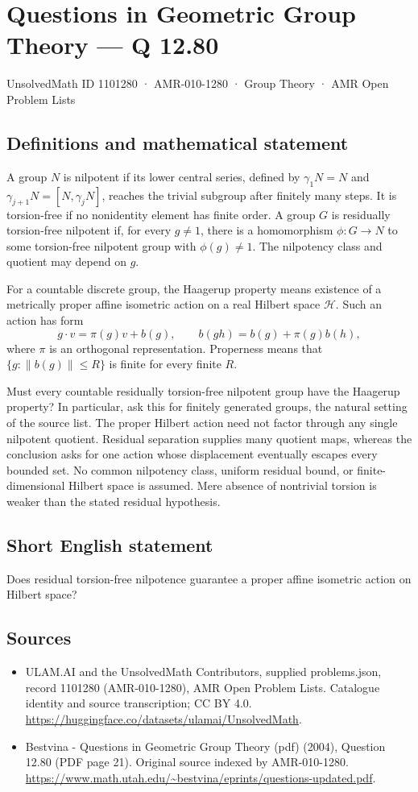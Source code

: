\documentclass[11pt,a4paper]{article}
\begin{document}
\section*{Questions in Geometric Group Theory — Q 12.80}\label{1101280}
{\small UnsolvedMath ID 1101280 · AMR-010-1280 · Group Theory · AMR Open Problem Lists}
\subsection{Definitions and mathematical statement}
A group $N$ is nilpotent if its lower central series, defined by $\gamma_1N=N$ and $\gamma_{j+1}N=[N,\gamma_jN]$, reaches the trivial subgroup after finitely many steps. It is torsion-free if no nonidentity element has finite order. A group $G$ is residually torsion-free nilpotent if, for every $g\ne1$, there is a homomorphism $\phi:G\to N$ to some torsion-free nilpotent group with $\phi(g)\ne1$. The nilpotency class and quotient may depend on $g$.

For a countable discrete group, the Haagerup property means existence of a metrically proper affine isometric action on a real Hilbert space $\mathcal H$. Such an action has form
\[
 g\cdot v=\pi(g)v+b(g),\qquad
 b(gh)=b(g)+\pi(g)b(h),
\]
where $\pi$ is an orthogonal representation. Properness means that $\{g:\|b(g)\|\leq R\}$ is finite for every finite $R$.

Must every countable residually torsion-free nilpotent group have the Haagerup property? In particular, ask this for finitely generated groups, the natural setting of the source list. The proper Hilbert action need not factor through any single nilpotent quotient. Residual separation supplies many quotient maps, whereas the conclusion asks for one action whose displacement eventually escapes every bounded set. No common nilpotency class, uniform residual bound, or finite-dimensional Hilbert space is assumed. Mere absence of nontrivial torsion is weaker than the stated residual hypothesis.
\subsection{Short English statement}
Does residual torsion-free nilpotence guarantee a proper affine isometric action on Hilbert space?
\subsection{Sources}
\begin{itemize}
\item[S1] ULAM.AI and the UnsolvedMath Contributors, supplied problems.json, record 1101280 (AMR-010-1280), AMR Open Problem Lists. Catalogue identity and source transcription; CC BY 4.0.
\url{https://huggingface.co/datasets/ulamai/UnsolvedMath}.
\item[S2] Bestvina - Questions in Geometric Group Theory (pdf) (2004), Question 12.80 (PDF page 21). Original source indexed by AMR-010-1280.
\url{https://www.math.utah.edu/~bestvina/eprints/questions-updated.pdf}.
\end{itemize}
\end{document}

